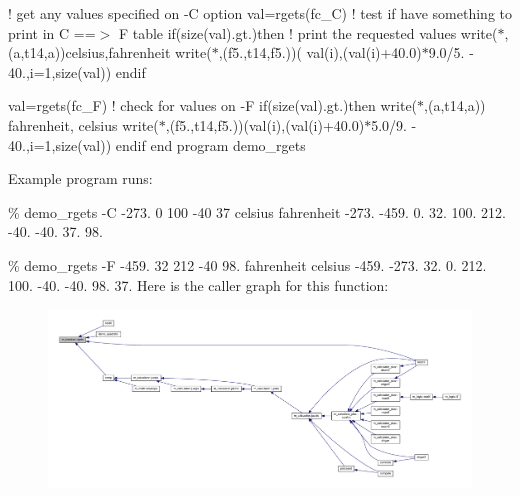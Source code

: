 ! get any values specified on -\/C option val=rgets(\textquotesingle{}fc\+\_\+C\textquotesingle{}) ! test if have something to print in C ==$>$ F table if(size(val).gt.)then ! print the requested values write($\ast$,\textquotesingle{}(a,t14,a)\textquotesingle{})\textquotesingle{}celsius\textquotesingle{},\textquotesingle{}fahrenheit\textquotesingle{} write($\ast$,\textquotesingle{}(f5.,t14,f5.)\textquotesingle{})( val(i),(val(i)+40.0)$\ast$9.0/5. -\/ 40.,i=1,size(val)) endif

val=rgets(\textquotesingle{}fc\+\_\+F\textquotesingle{}) ! check for values on -\/F if(size(val).gt.)then write($\ast$,\textquotesingle{}(a,t14,a)\textquotesingle{}) \textquotesingle{}fahrenheit\textquotesingle{}, \textquotesingle{}celsius\textquotesingle{} write($\ast$,\textquotesingle{}(f5.,t14,f5.)\textquotesingle{})(val(i),(val(i)+40.0)$\ast$5.0/9. -\/ 40.,i=1,size(val)) endif end program demo\+\_\+rgets

Example program runs\+:

\% demo\+\_\+rgets -\/C -\/273. 0 100 -\/40 37 celsius fahrenheit -\/273. -\/459. 0. 32. 100. 212. -\/40. -\/40. 37. 98.

\% demo\+\_\+rgets -\/F -\/459. 32 212 -\/40 98. fahrenheit celsius -\/459. -\/273. 32. 0. 212. 100. -\/40. -\/40. 98. 37. Here is the caller graph for this function\+:
\nopagebreak
\begin{figure}[H]
\begin{center}
\leavevmode
\includegraphics[width=350pt]{namespacem__kracken_aa1a29fad1518c15d8710d273755a17cc_icgraph}
\end{center}
\end{figure}
\mbox{\label{namespacem__kracken_aab831b470a3107ca69833e717e95eaec}} 
